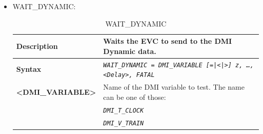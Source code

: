 \documentclass{template/openetcs}
\begin{document}
\begin{itemize}
\begin{longtable}{|l|l|}
				\hline \hline
				
			\end{longtable}

	\item WAIT\_DYNAMIC:
		
			\begin{longtable}{|l|l|}
			\caption{WAIT\_DYNAMIC}\\  
				\hline
				
					\begin{minipage}[t]{0.22\linewidth} \textbf{Description} \end{minipage} 
				&	\begin{minipage}[t]{0.78\linewidth} Waits the EVC to send to the DMI Dynamic data. \end{minipage} \\
				
				\hline
				
					\begin{minipage}[t]{0.22\linewidth} \textbf{Syntax}	\end{minipage}
				&	\begin{minipage}[t]{0.78\linewidth} \emph{\texttt{WAIT\_DYNAMIC = DMI\_VARIABLE [=|<|>] z,  …, <Delay>, FATAL}} \end{minipage} \\
				
				\hline
				
					\multirow{1}{*}{ \begin{minipage}[t]{0.22\linewidth} \textbf{<DMI\_VARIABLE>}	\end{minipage} }
				&	\begin{minipage}[t]{0.78\linewidth} Name of the DMI variable to test. The name can be one of those:\end{minipage} \\
				
				\hline
					
				&	\begin{minipage}[t]{0.78\linewidth} \emph{\texttt{DMI\_T\_CLOCK}} \end{minipage} \\
				
				\hline
				
				&	\begin{minipage}[t]{0.78\linewidth} \emph{\texttt{DMI\_V\_TRAIN}} \end{minipage} \\
								
				\hline
								

\end{longtable}
\end{itemize}
\end{document}
